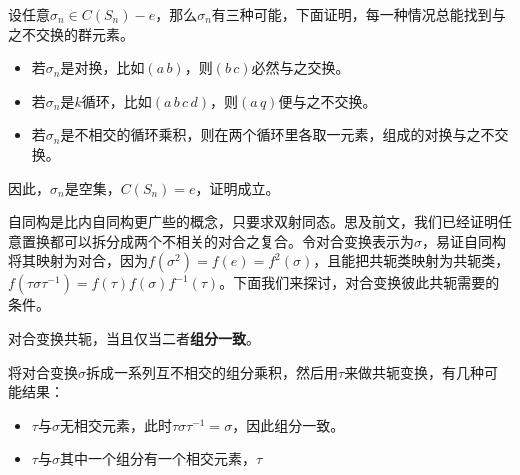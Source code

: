 设任意$\sigma_n\in C(S_n)-e$，那么$\sigma_n$有三种可能，下面证明，每一种情况总能找到与之不交换的群元素。

\begin{itemize}
\item 若$\sigma_n$是对换，比如$(a\,b)$，则$(b\,c)$必然与之交换。
\item 若$\sigma_n$是$k$循环，比如$(a\,b\,c\,d)$，则$(a\,q)$便与之不交换。
\item 若$\sigma_n$是不相交的循环乘积，则在两个循环里各取一元素，组成的对换与之不交换。
\end{itemize}
因此，$\sigma_n$是空集，$C(S_n)=e$，证明成立。

自同构是比内自同构更广些的概念，只要求双射同态。思及前文，我们已经证明任意置换都可以拆分成两个不相关的对合之复合。令对合变换表示为$\sigma$，易证自同构将其映射为对合，因为$f(\sigma^2)=f(e)=f^2(\sigma)$，且能把共轭类映射为共轭类，$f(\tau\sigma\tau^{-1})=f(\tau)f(\sigma)f^{-1}(\tau)$。下面我们来探讨，对合变换彼此共轭需要的条件。


\begin{lemma}{}
对合变换共轭，当且仅当二者\textbf{组分一致}。
\end{lemma}
将对合变换$\sigma$拆成一系列互不相交的组分乘积，然后用$\tau$来做共轭变换，有几种可能结果：
\begin{itemize}
\item $\tau$与$\sigma$无相交元素，此时$\tau\sigma\tau^{-1}=\sigma$，因此组分一致。
\item $\tau$与$\sigma$其中一个组分有一个相交元素，$\tau$
\end{itemize}